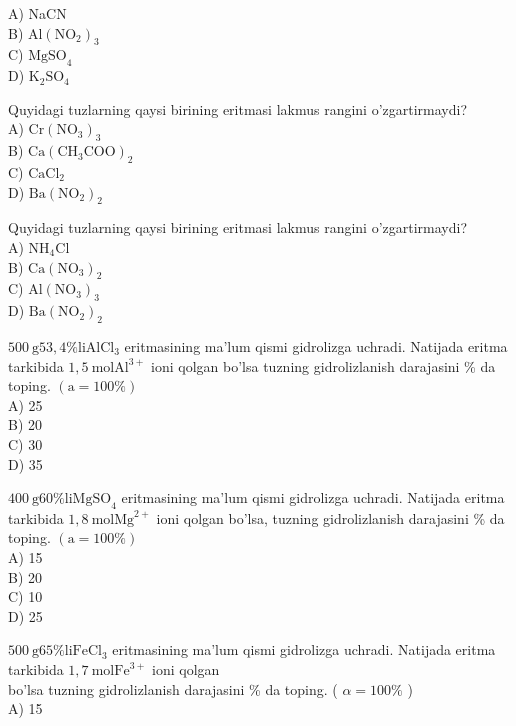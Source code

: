 A) NaCN\\
B) $\mathrm{Al}\left(\mathrm{NO}_{2}\right)_{3}$\\
C) $\mathrm{MgSO}_{4}$\\
D) $\mathrm{K}_{2} \mathrm{SO}_{4}$
  \item Quyidagi tuzlarning qaysi birining eritmasi lakmus rangini o'zgartirmaydi?\\
A) $\mathrm{Cr}\left(\mathrm{NO}_{3}\right)_{3}$\\
B) $\mathrm{Ca}\left(\mathrm{CH}_{3} \mathrm{COO}\right)_{2}$\\
C) $\mathrm{CaCl}_{2}$\\
D) $\mathrm{Ba}\left(\mathrm{NO}_{2}\right)_{2}$
  \item Quyidagi tuzlarning qaysi birining eritmasi lakmus rangini o'zgartirmaydi?\\
A) $\mathrm{NH}_{4} \mathrm{Cl}$\\
B) $\mathrm{Ca}\left(\mathrm{NO}_{3}\right)_{2}$\\
C) $\mathrm{Al}\left(\mathrm{NO}_{3}\right)_{3}$\\
D) $\mathrm{Ba}\left(\mathrm{NO}_{2}\right)_{2}$
  \item $500 \mathrm{~g} 53,4 \% \mathrm{li} \mathrm{AlCl}_{3}$ eritmasining ma'lum qismi gidrolizga uchradi. Natijada eritma tarkibida $1,5 \mathrm{~mol} \mathrm{Al}^{3+}$ ioni qolgan bo'lsa tuzning gidrolizlanish darajasini \% da toping. $(\mathrm{a}=100 \%)$\\
A) 25\\
B) 20\\
C) 30\\
D) 35
  \item $400 \mathrm{~g} 60 \% \mathrm{li} \mathrm{MgSO}_{4}$ eritmasining ma'lum qismi gidrolizga uchradi. Natijada eritma tarkibida $1,8 \mathrm{~mol} \mathrm{Mg}^{2+}$ ioni qolgan bo'lsa, tuzning gidrolizlanish darajasini \% da toping. $(\mathrm{a}=100 \%)$\\
A) 15\\
B) 20\\
C) 10\\
D) 25
  \item $500 \mathrm{~g} 65 \% \mathrm{li} \mathrm{FeCl}_{3}$ eritmasining ma'lum qismi gidrolizga uchradi. Natijada eritma tarkibida $1,7 \mathrm{~mol} \mathrm{Fe}^{3+}$ ioni qolgan\\
bo'lsa tuzning gidrolizlanish darajasini \% da toping. ( $\alpha=100 \%$ )\\
A) 15\\
